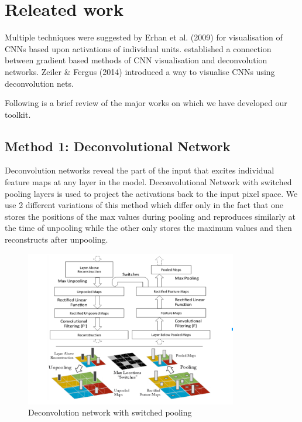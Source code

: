 \documentclass{article} %
\begin{document}
\section{Releated work}
Multiple techniques were suggested by Erhan et al. (2009) for visualisation of CNNs based upon activations
of individual units. \citet{simonyan2013deep} established a connection between gradient based
methods of CNN visualisation and deconvolution networks. Zeiler & Fergus (2014) introduced a
way to visualise CNNs using deconvolution nets.

Following is a brief review of the major works on which we have developed our toolkit.

\subsection{Method 1: Deconvolutional Network}
Deconvolution networks reveal the part of the input that excites individual feature maps at
any layer in the model. Deconvolutional Network with switched pooling layers is used to
project the activations back to the input pixel space.
We use 2 different variations of this method which
differ only in the fact that one stores the positions of the max values during
pooling and reproduces similarly at the time of unpooling while the other only
stores the maximum values and then reconstructs after unpooling.

\begin{figure}[h]
  \begin{center}
  \includegraphics[width=350]{dnet.png}
  \end{center}
  \caption{Deconvolution network with switched pooling}
\end{figure}
\end{document}
